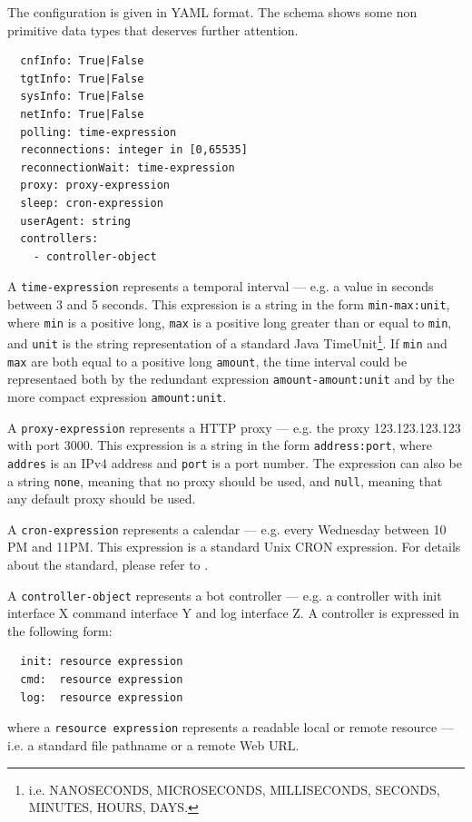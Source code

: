 The configuration is given in YAML format. The schema shows some non primitive data types that deserves further attention.

\begin{verbatim}
  cnfInfo: True|False
  tgtInfo: True|False
  sysInfo: True|False
  netInfo: True|False
  polling: time-expression
  reconnections: integer in [0,65535]
  reconnectionWait: time-expression
  proxy: proxy-expression
  sleep: cron-expression
  userAgent: string
  controllers:
    - controller-object
\end{verbatim}

A \texttt{time-expression} represents a temporal interval — e.g. a value in seconds between 3 and 5 seconds. This expression is a string in the form \texttt{min-max:unit}, where \texttt{min} is a positive long, \texttt{max} is a positive long greater than or equal to \texttt{min}, and \texttt{unit} is the string representation of a standard Java TimeUnit\footnote{i.e. NANOSECONDS, MICROSECONDS, MILLISECONDS, SECONDS, MINUTES, HOURS, DAYS.}. If \texttt{min} and \texttt{max} are both equal to a positive long \texttt{amount}, the time interval could be representaed both by the redundant expression \texttt{amount-amount:unit} and by the more compact expression \texttt{amount:unit}.

A \texttt{proxy-expression} represents a HTTP proxy — e.g. the proxy 123.123.123.123 with port 3000. This expression is a string in the form \texttt{address:port}, where \texttt{addres} is an IPv4 address and \texttt{port} is a port number. The expression can also be a string \texttt{none}, meaning that no proxy should be used, and \texttt{null}, meaning that any default proxy should be used.

A \texttt{cron-expression} represents a calendar — e.g. every Wednesday between 10 PM and 11PM. This expression is a standard Unix CRON expression. For details about the standard, please refer to \cite{cron-expression}.

A \texttt{controller-object} represents a bot controller — e.g. a controller with init interface X command interface Y and log interface Z. A controller is expressed in the following form:

\begin{verbatim}
  init: resource expression
  cmd:  resource expression
  log:  resource expression
\end{verbatim}

where a \texttt{resource expression} represents a readable local or remote resource — i.e. a standard file pathname or a remote Web URL.

